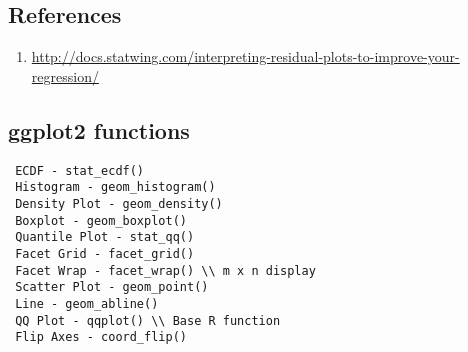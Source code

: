 \documentclass[11pt]{article}
\begin{document}
\subsection*{References}
\begin{enumerate}
	\item \url{http://docs.statwing.com/interpreting-residual-plots-to-improve-your-regression/}
\end{enumerate}
\subsection*{ggplot2 functions}
\begin{verbatim}
 ECDF - stat_ecdf()
 Histogram - geom_histogram()
 Density Plot - geom_density()
 Boxplot - geom_boxplot()
 Quantile Plot - stat_qq()
 Facet Grid - facet_grid()
 Facet Wrap - facet_wrap() \\ m x n display
 Scatter Plot - geom_point()
 Line - geom_abline()
 QQ Plot - qqplot() \\ Base R function
 Flip Axes - coord_flip()
\end{verbatim}
\end{document}

